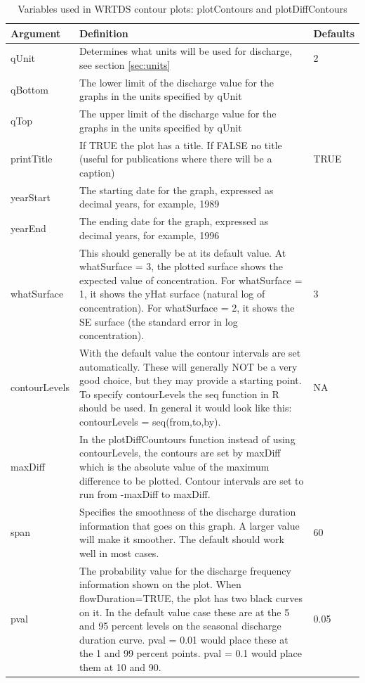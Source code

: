 \documentclass[a4paper,11pt]{article}\usepackage[]{graphicx}\usepackage[]{color}
\begin{document}
\begin{table}[ht]
\caption{Variables used in WRTDS contour plots: plotContours and plotDiffContours \label{tab:wrtdsContourVariables}}
\begin{tabularx}{\textwidth}{lXl}
\hline
  \textbf{Argument} & \textbf{Definition} & \textbf{Defaults}\\
\hline
qUnit & Determines what units will be used for discharge, see section \ref{sec:units} & 2\\
qBottom & The lower limit of the discharge value for the graphs in the units specified by qUnit &\\
qTop & The upper limit of the discharge value for the graphs in the units specified by qUnit &\\
printTitle & If TRUE the plot has a title.  If FALSE no title (useful for publications where there will be a caption) & TRUE \\
yearStart & The starting date for the graph, expressed as decimal years, for example, 1989 & \\
yearEnd & The ending date for the graph, expressed as decimal years, for example, 1996 & \\
whatSurface & This should generally be at its default value.  At whatSurface = 3, the plotted surface shows the expected value of concentration.  For whatSurface = 1, it shows the yHat surface (natural log of concentration).  For whatSurface = 2, it shows the SE surface (the standard error in log concentration). & 3\\
contourLevels & With the default value the contour intervals are set automatically.  These will generally NOT be a very good choice, but they may provide a starting point.  To specify contourLevels the seq function in R should be used.  In general it would look like this: contourLevels = seq(from,to,by). & NA\\
maxDiff & In the plotDiffCountours function instead of using contourLevels, the contours are set by maxDiff which is the absolute value of the maximum difference to be plotted.  Contour intervals are set to run from -maxDiff to maxDiff. &\\
span & Specifies the smoothness of the discharge duration information that goes on this graph.  A larger value will make it smoother.  The default should work well in most cases. & 60\\
pval & The probability value for the discharge frequency information shown on the plot.  When flowDuration=TRUE, the plot has two black curves on it.  In the default value case these are at the 5 and 95 percent levels on the seasonal discharge duration curve.  pval = 0.01 would place these at the 1 and 99 percent points.  pval = 0.1 would place them at 10  and 90. & 0.05\\

\end{tabularx}
\end{table}
\end{document}
